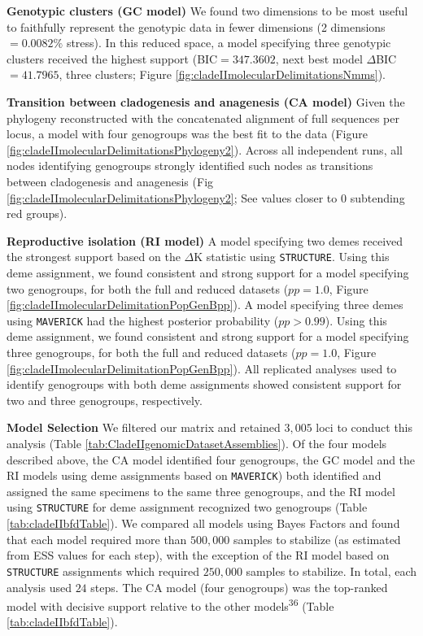 \documentclass[
  11pt,
]{article}
\begin{document}
\textbf{Genotypic clusters (GC model)} We found two dimensions to be most useful to faithfully represent the genotypic data in fewer dimensions (2 dimensions \(=0.0082\%\) stress). In this reduced space, a model specifying three genotypic clusters received the highest support (BIC\(=347.3602\), next best model \(\Delta\)BIC\(=41.7965\), three clusters; Figure \ref{fig:cladeIImolecularDelimitationsNmms}).

\textbf{Transition between cladogenesis and anagenesis (CA model)} Given the phylogeny reconstructed with the concatenated alignment of full sequences per locus, a model with four genogroups was the best fit to the data (Figure \ref{fig:cladeIImolecularDelimitationsPhylogeny2}). Across all independent runs, all nodes identifying genogroups strongly identified such nodes as transitions between cladogenesis and anagenesis (Fig \ref{fig:cladeIImolecularDelimitationsPhylogeny2}; See values closer to \(0\) subtending red groups).

\textbf{Reproductive isolation (RI model)} A model specifying two demes received the strongest support based on the \(\Delta\)K statistic using \texttt{STRUCTURE}. Using this deme assignment, we found consistent and strong support for a model specifying two genogroups, for both the full and reduced datasets (\(pp=1.0\), Figure \ref{fig:cladeIImolecularDelimitationPopGenBpp}). A model specifying three demes using \texttt{MAVERICK} had the highest posterior probability (\(pp>0.99\)). Using this deme assignment, we found consistent and strong support for a model specifying three genogroups, for both the full and reduced datasets (\(pp=1.0\), Figure \ref{fig:cladeIImolecularDelimitationPopGenBpp}). All replicated analyses used to identify genogroups with both deme assignments showed consistent support for two and three genogroups, respectively.

\textbf{Model Selection} We filtered our matrix and retained \(3,005\) loci to conduct this analysis (Table \ref{tab:CladeIIgenomicDatasetAssemblies}). Of the four models described above, the CA model identified four genogroups, the GC model and the RI models using deme assignments based on \texttt{MAVERICK}) both identified and assigned the same specimens to the same three genogroups, and the RI model using \texttt{STRUCTURE} for deme assignment recognized two genogroups (Table \ref{tab:cladeIIbfdTable}). We compared all models using Bayes Factors and found that each model required more than \(500,000\) samples to stabilize (as estimated from ESS values for each step), with the exception of the RI model based on \texttt{STRUCTURE} assignments which required \(250,000\) samples to stabilize. In total, each analysis used \(24\) steps. The CA model (four genogroups) was the top-ranked model with decisive support relative to the other models\textsuperscript{36} (Table \ref{tab:cladeIIbfdTable}).
\end{document}
